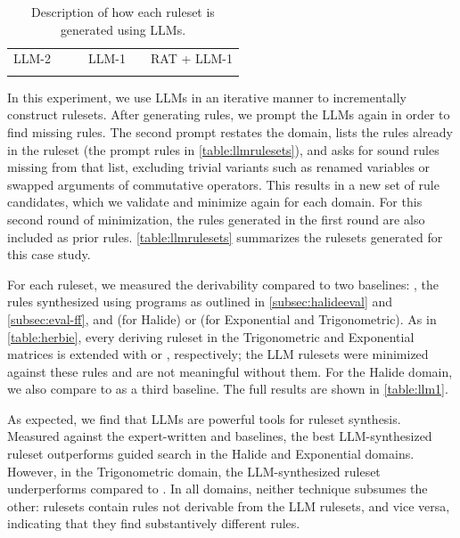 \begin{table}[t]
{\begin{tabular}{|l|l|l|l|c|l|}
LLM-2        &                                &                                                                                                                                                                                               & LLM-1        &                                                                                     & RAT + LLM-1          \\
             &                                &                                                                                                                                                                                               &              &                                                                                     &                     \\ \hline
\end{tabular}%
}
\caption{Description of how each ruleset is generated using LLMs.}
\label{table:llmrulesets}
\end{table}

In this experiment, we use LLMs
  in an iterative manner to
  incrementally construct rulesets.
After generating rules, we prompt
  the LLMs again in order to find missing rules.
The second prompt restates the domain, lists the rules already in the
  ruleset (the prompt rules in \autoref{table:llmrulesets}),
  and asks for sound rules missing from that list, excluding trivial
  variants such as renamed variables or swapped arguments of
  commutative operators.
This results in a new set of rule candidates,
  which we validate and minimize again
  for each domain.
For this second round of minimization,
  the rules generated in the first round
  are also included as prior rules.
\autoref{table:llmrulesets} summarizes the rulesets generated for this case study.

For each ruleset, we measured the
  \lhsandrhs derivability compared to two baselines: ,
  the rules synthesized using \enumo programs as
  outlined in \autoref{subsec:halideeval} and \autoref{subsec:eval-ff},
  and  (for Halide) or  (for Exponential and Trigonometric).
As in \autoref{table:herbie}, every deriving ruleset in the Trigonometric
  and Exponential matrices is extended with  or , respectively;
  the LLM rulesets were minimized against these rules and are not
  meaningful without them.
For the Halide domain, we also compare to  as a third baseline.
The full results are shown in \autoref{table:llm1}.

As expected, we find that LLMs are powerful tools for ruleset synthesis.
Measured against the expert-written  and  baselines,
  the best LLM-synthesized ruleset outperforms guided search in
  the Halide and Exponential domains.
However, in the Trigonometric domain, the LLM-synthesized ruleset underperforms
  compared to .
In all domains, neither technique subsumes the other:
   rulesets contain
  rules not derivable from the LLM rulesets, and vice versa,
  indicating that they find substantively different rules.

